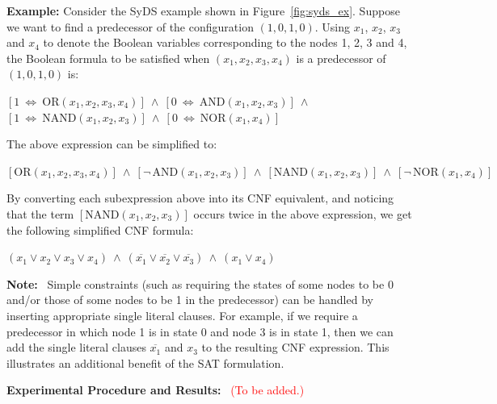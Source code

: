 \noindent
\textbf{Example:} Consider the SyDS example shown in Figure~\ref{fig:syds_ex}.
Suppose we want to find a predecessor of the configuration $(1, 0, 1, 0)$.
Using $x_1$, $x_2$, $x_3$ and $x_4$ to denote the Boolean variables corresponding
to the nodes 1, 2, 3 and 4, the Boolean formula to be satisfied when 
$(x_1, x_2, x_3, x_4)$ is a predecessor of $(1, 0, 1, 0)$ is:  

\medskip

\noindent
\hspace*{0.5in} $[1 ~\Leftrightarrow~ \mathrm{OR}(x_1, x_2, x_3, x_4)] ~\wedge~
[0 ~\Leftrightarrow~ \mathrm{AND}(x_1, x_2, x_3)] ~\wedge~ $\\
\hspace*{0.5in}
$[1 ~\Leftrightarrow~ \mathrm{NAND}(x_1, x_2, x_3)] ~\wedge~
[0 ~\Leftrightarrow~ \mathrm{NOR}(x_1, x_4)]$

\smallskip

\noindent
The above expression can be simplified to:

\begin{center}
$[\mathrm{OR}(x_1, x_2, x_3, x_4)] ~\wedge~
[\neg\,\mathrm{AND}(x_1, x_2, x_3)] ~\wedge~ 
[\mathrm{NAND}(x_1, x_2, x_3)] ~\wedge~
[\neg\,\mathrm{NOR}(x_1, x_4)]$
\end{center}

\noindent
By converting each subexpression above into its CNF equivalent, and
noticing that the term $[\mathrm{NAND}(x_1, x_2, x_3)]$ occurs twice
in the above expression, we get the following simplified
CNF formula:

\begin{center}
$(x_1 \vee  x_2 \vee  x_3 \vee  x_4)  ~\wedge~
(\overline{x_1} \vee \overline{x_2} \vee \overline{x_3}) ~\wedge~ 
(x_1 \vee x_4)$
\end{center}


\noindent
\textbf{Note:}~ Simple constraints (such as requiring
the states of some nodes to be 0 and/or those of some nodes to be 1
in the predecessor) can be handled by inserting appropriate 
single literal clauses.
For example, if we require a predecessor in which node 1 is in state 0
and node 3 is in state 1, then we can add the single literal clauses
$\overline{x_1}$ and $x_3$ to the resulting CNF expression.
This illustrates an additional benefit of the SAT formulation.

\smallskip

\noindent
\textbf{Experimental Procedure and Results:}~ \textcolor{red}{(To be added.)}
